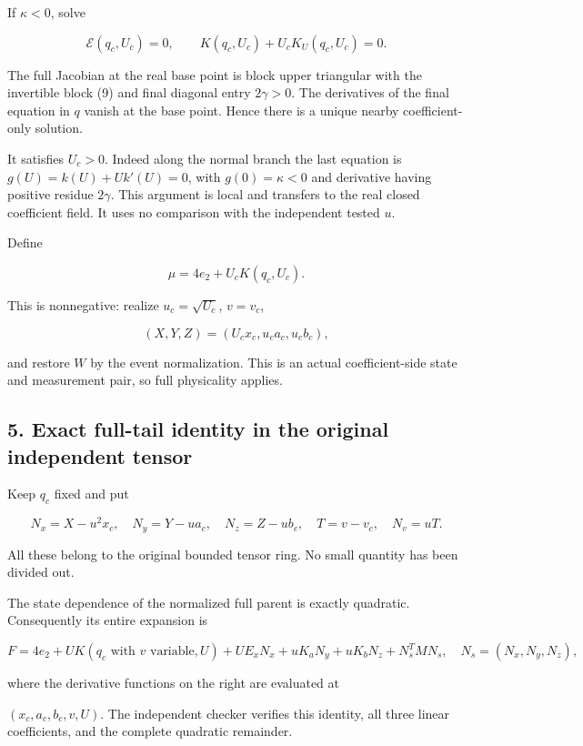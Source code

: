 If \(\kappa<0\), solve

\[
\mathcal E(q_c,U_c)=0,\qquad
K(q_c,U_c)+U_cK_U(q_c,U_c)=0.
\tag{11}
\]

The full Jacobian at the real base point is block upper triangular with
the invertible block (9) and final diagonal entry \(2\gamma>0\). The
derivatives of the final equation in \(q\) vanish at the base point.
Hence there is a unique nearby coefficient-only solution.

It satisfies \(U_c>0\). Indeed along the normal branch the last equation
is \(g(U)=k(U)+Uk'(U)=0\), with \(g(0)=\kappa<0\) and derivative having
positive residue \(2\gamma\). This argument is local and transfers to
the real closed coefficient field. It uses no comparison with the
independent tested \(u\).

Define

\[
\mu=4e_2+U_cK(q_c,U_c).
\tag{12}
\]

This is nonnegative: realize \(u_c=\sqrt{U_c}\), \(v=v_c\),

\[
(X,Y,Z)=(U_cx_c,u_ca_c,u_cb_c),
\]

and restore \(W\) by the event normalization. This is an actual
coefficient-side state and measurement pair, so full physicality applies.

\hypertarget{exact-full-tail-identity-in-the-original-independent-tensor}{%
\subsection{5. Exact full-tail identity in the original independent tensor}\label{p4ec1a51262f9:exact-full-tail-identity-in-the-original-independent-tensor}}

Keep \(q_c\) fixed and put

\[
N_x=X-u^2x_c,\quad N_y=Y-ua_c,\quad N_z=Z-ub_c,
\quad T=v-v_c,\quad N_v=uT.
\tag{13}
\]

All these belong to the original bounded tensor ring. No small quantity
has been divided out.

The state dependence of the normalized full parent is exactly quadratic.
Consequently its entire expansion is

\[
F=4e_2+U K(q_c\text{ with }v\text{ variable},U)
+U E_xN_x+uK_aN_y+uK_bN_z+N_s^TMN_s,
\quad N_s=(N_x,N_y,N_z),
\tag{14}
\]

where the derivative functions on the right are evaluated at

\((x_c,a_c,b_c,v,U)\). The independent checker verifies this identity,
all three linear coefficients, and the complete quadratic remainder.


